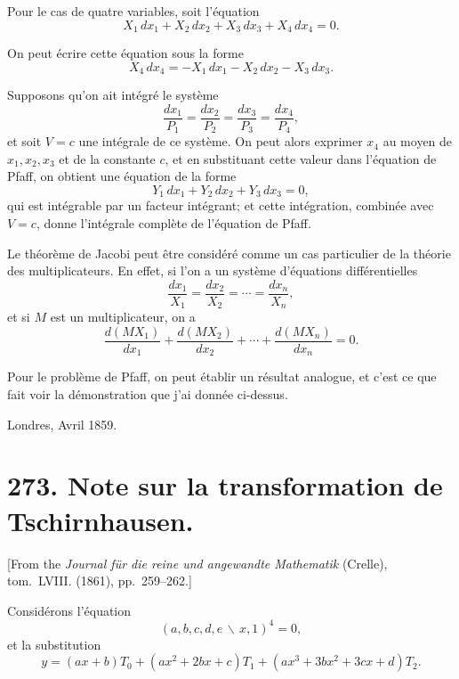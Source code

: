 \documentclass[11pt,a4paper]{book}
\begin{document}
Pour le cas de quatre variables, soit l'\'{e}quation
\[X_{1}\,dx_{1} + X_{2}\,dx_{2} + X_{3}\,dx_{3} + X_{4}\,dx_{4} = 0.\]

On peut \'{e}crire cette \'{e}quation sous la forme
\[X_{4}\,dx_{4} = -X_{1}\,dx_{1} - X_{2}\,dx_{2} - X_{3}\,dx_{3}.\]

Supposons qu'on ait int\'{e}gr\'{e} le syst\`{e}me
\[\frac{dx_{1}}{P_{1}} = \frac{dx_{2}}{P_{2}} = \frac{dx_{3}}{P_{3}} = \frac{dx_{4}}{P_{4}},\]
et soit $V = c$ une int\'{e}grale de ce syst\`{e}me. On peut alors exprimer $x_{4}$ au moyen
de $x_{1}, x_{2}, x_{3}$ et de la constante $c$, et en substituant cette valeur dans l'\'{e}quation
de Pfaff, on obtient une \'{e}quation de la forme
\[Y_{1}\,dx_{1} + Y_{2}\,dx_{2} + Y_{3}\,dx_{3} = 0,\]
qui est int\'{e}grable par un facteur int\'{e}grant; et cette int\'{e}gration, combin\'{e}e avec
$V = c$, donne l'int\'{e}grale compl\`{e}te de l'\'{e}quation de Pfaff.

Le th\'{e}or\`{e}me de Jacobi peut \^{e}tre consid\'{e}r\'{e} comme un cas particulier de la
th\'{e}orie des multiplicateurs. En effet, si l'on a un syst\`{e}me d'\'{e}quations
diff\'{e}rentielles
\[\frac{dx_{1}}{X_{1}} = \frac{dx_{2}}{X_{2}} = \cdots = \frac{dx_{n}}{X_{n}},\]
et si $M$ est un multiplicateur, on a
\[\frac{d(MX_{1})}{dx_{1}} + \frac{d(MX_{2})}{dx_{2}} + \cdots + \frac{d(MX_{n})}{dx_{n}} = 0.\]

Pour le probl\`{e}me de Pfaff, on peut \'{e}tablir un r\'{e}sultat analogue, et c'est ce
que fait voir la d\'{e}monstration que j'ai donn\'{e}e ci-dessus.

\begin{flushright}
Londres, Avril 1859.
\end{flushright}

\newpage
\section*{273. Note sur la transformation de Tschirnhausen.}

[From the \textit{Journal f\"{u}r die reine und angewandte Mathematik} (Crelle),
tom.~LVIII. (1861), pp.~259--262.]
\vspace{0.5em}

Consid\'{e}rons l'\'{e}quation
\[(a,b,c,d,e\,\backslash\!\!\,x,1)^{4} = 0,\]
et la substitution
\[y = (ax+b)T_{0} + (ax^{2}+2bx+c)T_{1} + (ax^{3}+3bx^{2}+3cx+d)T_{2}.\]
\end{document}
